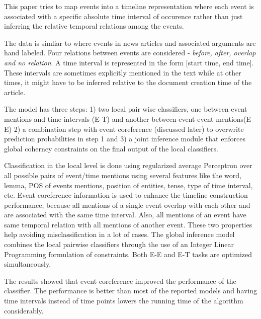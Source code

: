 This paper tries to map events into a timeline representation where each event is associated with a specific absolute time interval of occurence rather than just inferring the relative temporal relations among the events. 

The data is simliar to \citeauthor{temporalordering} where events in news articles and associated arguments are hand labeled. Four relations between events are considered - {\em before, after, overlap and no relation}. A time interval is represented in the form [start time, end time]. These intervals are sometimes explicitly mentioned in the text while at other times, it might have to be inferred relative to the document creation time of the article. 

The model has three steps: 1) two local pair wise classifiers, one between event mentions and time intervals (E-T) and another between event-event mentions(E-E) 2) a combination step with event coreference (discussed later) to overwrite prediction probabilities in step 1 and 3) a joint inference  module that enforces global coherncy constraints on the final output of the local classifiers. 

Classification in the local level is done using regularized average Perceptron over all possible pairs of event/time mentions using several features like the word, lemma, POS of events mentions, position of entities, tense, type of time interval, etc. Event coreference information is used to enhance the timeline construction performance, because all mentions of a single event overlap with each other and are associated with the same time interval. Also, all mentions of an event have same temporal relation with all mentions of another event. These two properties help avoiding misclassification in a lot of cases. The global inference model combines the local pairwise classifiers through the use of an Integer Linear Programming formulation of constraints. Both E-E and E-T tasks are optimized simultaneously. 

The results showed that event coreference improved the performance of the classifier. The performance is better than most of the reported models and having time intervals instead of time points lowers the running time of the algorithm considerably. 


